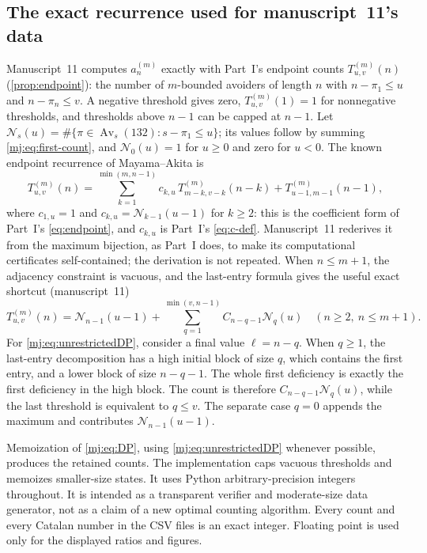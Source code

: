\documentclass[11pt,a4paper]{article}
\theoremstyle{definition}\newaliascnt{definition}{theorem}
\theoremstyle{remark}\newaliascnt{remark}{theorem}
\newcommand{\Av}{\operatorname{Av}}
\begin{document}
\subsection{The exact recurrence used for manuscript~11's data}
\label{mj:sec:exact-data}
Manuscript~11 computes $a_n^{(m)}$ exactly with Part~I's endpoint counts
$T^{(m)}_{u,v}(n)$ (\cref{prop:endpoint}): the number of $m$-bounded
avoiders of length $n$ with $n-\pi_1\le u$ and $n-\pi_n\le v$. A negative
threshold gives zero, $T^{(m)}_{u,v}(1)=1$ for nonnegative thresholds, and
thresholds above $n-1$ can be capped at $n-1$. Let
$\mathcal N_s(u)=\#\{\pi\in\Av_s(132):s-\pi_1\le u\}$; its values follow by
summing \eqref{mj:eq:first-count}, and $\mathcal N_0(u)=1$ for $u\ge0$ and
zero for $u<0$. The known endpoint recurrence of Mayama--Akita is
\begin{equation}
 T_{u,v}^{(m)}(n)=
 \sum_{k=1}^{\min(m,n-1)} c_{k,u}\,
        T_{m-k,v-k}^{(m)}(n-k)
   +T_{u-1,m-1}^{(m)}(n-1),
 \label{mj:eq:DP}
\end{equation}
where $c_{1,u}=1$ and $c_{k,u}=\mathcal N_{k-1}(u-1)$ for $k\ge2$: this is
the coefficient form of Part~I's \eqref{eq:endpoint}, and $c_{k,u}$ is
Part~I's \eqref{eq:c-def}. Manuscript~11 rederives it from the maximum
bijection, as Part~I does, to make its computational certificates
self-contained; the derivation is not repeated. When $n\le m+1$, the
adjacency constraint is vacuous, and the last-entry formula gives the useful
exact shortcut (manuscript~11)
\begin{equation}
 T_{u,v}^{(m)}(n)
 =\mathcal N_{n-1}(u-1)+
   \sum_{q=1}^{\min(v,n-1)}C_{n-q-1}\mathcal N_q(u)
 \quad(n\ge2,\ n\le m+1).
 \label{mj:eq:unrestrictedDP}
\end{equation}
For \eqref{mj:eq:unrestrictedDP}, consider a final value $\ell=n-q$. When
$q\ge1$, the last-entry decomposition has a high initial block of size $q$,
which contains the first entry, and a lower block of size $n-q-1$. The whole
first deficiency is exactly the first deficiency in the high block. The count
is therefore $C_{n-q-1}\mathcal N_q(u)$, while the last threshold is
equivalent to $q\le v$. The separate case $q=0$ appends the maximum and
contributes $\mathcal N_{n-1}(u-1)$.

Memoization of \eqref{mj:eq:DP}, using \eqref{mj:eq:unrestrictedDP} whenever
possible, produces the retained counts. The implementation caps vacuous
thresholds and memoizes smaller-size states. It uses Python
arbitrary-precision integers throughout. It is intended as a transparent
verifier and moderate-size data generator, not as a claim of a new optimal
counting algorithm. Every count and every Catalan number in the CSV files is
an exact integer. Floating point is used only for the displayed ratios and
figures.
\end{document}
